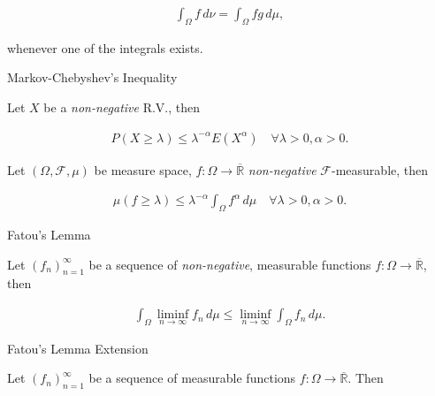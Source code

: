 \documentclass[10pt,landscape]{article}
\renewcommand{\leq}{\leqslant}
\renewcommand{\geq}{\geqslant}
\begin{document}
\begin{multicols}{3}
\begin{proposition}{3.16}{}
        \begin{align*}
            \int_{\Omega} f \, d\nu = \int_{\Omega} fg \, d\mu,
        \end{align*}

    whenever one of the integrals exists.

\end{proposition}

\begin{proposition}{3.18}{Markov-Chebyshev's Inequality}

    Let $X$ be a \emph{non-negative} R.V., then

        \begin{align*}
            P(X \geq \lambda) \leq \lambda^{-\alpha} E(X^{\alpha}) \quad \forall \lambda > 0, \alpha > 0.
        \end{align*}

\end{proposition}

\begin{remark}{3.3}{}

    Let $(\Omega, \mathcal{F}, \mu)$ be measure space, $f: \Omega \to \overline{\mathbb{R}}$ \emph{non-negative} $\mathcal{F}$-measurable, then

        \begin{align*}
            \mu(f \geq \lambda) \leq \lambda^{-\alpha} \int_{\Omega} f^{\alpha} \,d\mu \quad \forall \lambda > 0, \alpha > 0.
        \end{align*}

\end{remark}

\begin{lemma}{3.10}{Fatou's Lemma}

    Let $(f_n)_{n=1}^{\infty}$ be a sequence of \emph{non-negative}, measurable functions $f: \Omega \to \overline{\mathbb{R}}$, then

        \begin{align*}
            \int_{\Omega} \liminf_{n \to \infty} f_n \, d\mu \leq \liminf_{n \to \infty} \int_{\Omega} f_n \, d\mu.
        \end{align*}

\end{lemma}

\begin{corollary}{3.11}{Fatou's Lemma Extension}

    Let $(f_n)_{n=1}^{\infty}$ be a sequence of measurable functions $f: \Omega \to \overline{\mathbb{R}}$. Then


\end{corollary}
\end{multicols}
\end{document}
